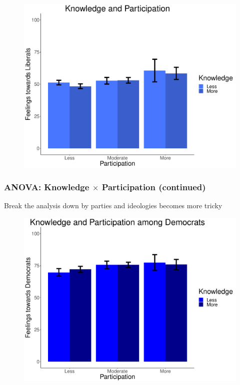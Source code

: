 \documentclass[14pt]{beamer}
\begin{document}
\begin{frame}
\begin{center}
\begin{figure}[ht!]  
	{	 \includegraphics[width=\textwidth]{KPLib}}
\end{figure}
\end{center}
\end{frame}

\begin{frame}
\frametitle{ANOVA: Knowledge $\times$ Participation (continued)}
Break the analysis down by parties and ideologies becomes more tricky
\end{frame}

\begin{frame}
\begin{center}
	\begin{figure}[ht!]  
		{	 \includegraphics[width=\textwidth]{KPDemADem}}
	\end{figure}
\end{center}
\end{frame}
\end{document}
